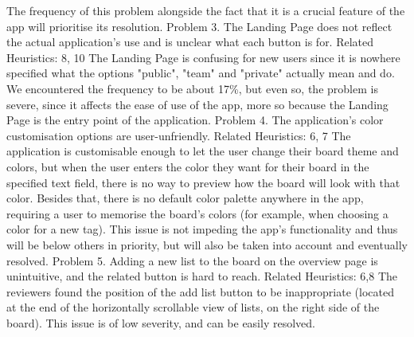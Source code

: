 \indent The frequency of this problem alongside the fact that it is a crucial feature of the app will prioritise its resolution.
\newline
\newline
Problem 3.
\newline
The Landing Page does not reflect the actual application's use and is unclear what each button is for.
\newline
Related Heuristics: 8, 10
\newline
\indent The Landing Page is confusing for new users since it is nowhere specified what the options "public", "team" and "private" actually mean and do. We encountered the frequency to be about 17\%, but even so, the problem is severe, since it affects the ease of use of the app, more so because the Landing Page is the entry point of the application.
\newline
\newline
Problem 4.
\newline
The application's color customisation options are user-unfriendly.
\newline
Related Heuristics: 6, 7
\newline
\indent The application is customisable enough to let the user change their board theme and colors, but when the user enters the color they want for their board in the specified text field, there is no way to preview how the board will look with that color. Besides that, there is no default color palette anywhere in the app, requiring a user to memorise the board's colors (for example, when choosing a color for a new tag).
\newline
\indent This issue is not impeding the app's functionality and thus will be below others in priority, but will also be taken into account and eventually resolved.
\newline
\newline
Problem 5.
\newline
Adding a new list to the board on the overview page is unintuitive, and the related button is hard to reach.
\newline
Related Heuristics: 6,8
\newline
\indent The reviewers found the position of the add list button to be inappropriate (located at the end of the horizontally scrollable view of lists, on the right side of the board). 
\newline
\indent This issue is of low severity, and can be easily resolved.
\newline
\newline
